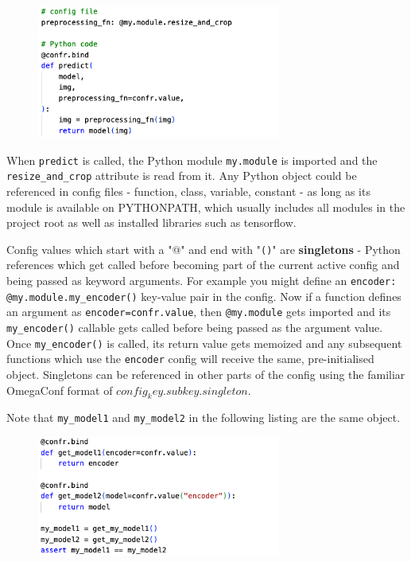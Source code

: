 \documentclass{itatnew}
\begin{document}
\begin{figure}[H]
    \centering
    \includegraphics[width=8cm]{c6.png}
\end{figure}

When \texttt{predict} is called, the Python module \texttt{my.module} is imported and the \texttt{resize_and_crop} attribute is read from it. Any Python object could be referenced in config files - function, class, variable, constant - as long as its module is available on PYTHONPATH, which usually includes all modules in the project root as well as installed libraries such as tensorflow.

Config values which start with a "@" and end with "\texttt{()}" are \textbf{singletons} - Python references which get called before becoming part of the current active config and being passed as keyword arguments. For example you might define an \texttt{encoder: @my.module.my_encoder()} key-value pair in the config. Now if a function defines an argument as \texttt{encoder=confr.value}, then \texttt{@my.module} gets imported and its \texttt{my_encoder()} callable gets called before being passed as the argument value. Once \texttt{my_encoder()} is called, its return value gets memoized and any subsequent functions which use the \texttt{encoder} config will receive the same, pre-initialised object. Singletons can be referenced in other parts of the config using the familiar OmegaConf format of \texttt{${config_key.subkey.singleton}$}.

Note that \texttt{my_model1} and \texttt{my_model2} in the following listing are the same object.

\begin{figure}[H]
    \centering
    \includegraphics[width=8cm]{c7.png}
\end{figure}
\end{document}

